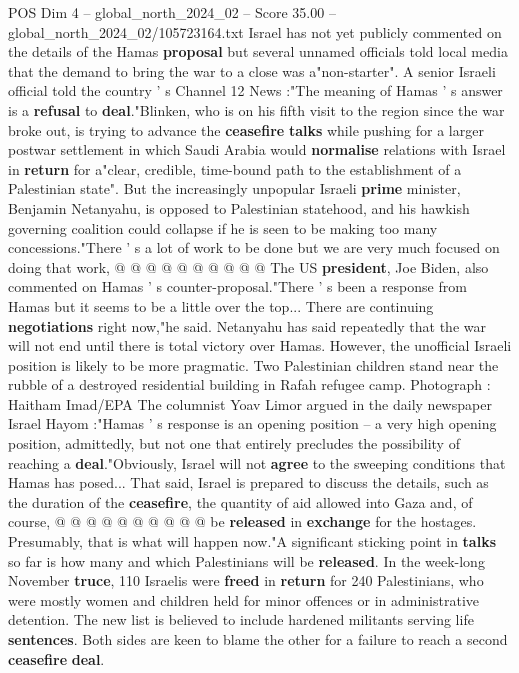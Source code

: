 \begin{textsample}{POS Dim 4 – global\_north\_2024\_02 – Score 35.00 – global\_north\_2024\_02/105723164.txt}
Israel has not yet publicly commented on the details of the Hamas \textbf{proposal} but several unnamed officials told local media that the demand to bring the war to a close was a"non-starter".
A senior Israeli official told the country ' s Channel 12 News :"The meaning of Hamas ' s answer is a \textbf{refusal} to \textbf{deal}."Blinken, who is on his fifth visit to the region since the war broke out, is trying to advance the \textbf{ceasefire} \textbf{talks} while pushing for a larger postwar settlement in which Saudi Arabia would \textbf{normalise} relations with Israel in \textbf{return} for a"clear, credible, time-bound path to the establishment of a Palestinian state".
But the increasingly unpopular Israeli \textbf{prime} minister, Benjamin Netanyahu, is opposed to Palestinian statehood, and his hawkish governing coalition could collapse if he is seen to be making too many concessions."There ' s a lot of work to be done but we are very much focused on doing that work, @ @ @ @ @ @ @ @ @ @ The US \textbf{president}, Joe Biden, also commented on Hamas ' s counter-proposal."There ' s been a response from Hamas but it seems to be a little over the top...
There are continuing \textbf{negotiations} right now,"he said.
Netanyahu has said repeatedly that the war will not end until there is total victory over Hamas.
However, the unofficial Israeli position is likely to be more pragmatic.
Two Palestinian children stand near the rubble of a destroyed residential building in Rafah refugee camp.
Photograph : Haitham Imad/EPA The columnist Yoav Limor argued in the daily newspaper Israel Hayom :"Hamas ' s response is an opening position -- a very high opening position, admittedly, but not one that entirely precludes the possibility of reaching a \textbf{deal}."Obviously, Israel will not \textbf{agree} to the sweeping conditions that Hamas has posed...
That said, Israel is prepared to discuss the details, such as the duration of the \textbf{ceasefire}, the quantity of aid allowed into Gaza and, of course, @ @ @ @ @ @ @ @ @ @ be \textbf{released} in \textbf{exchange} for the hostages.
Presumably, that is what will happen now."A significant sticking point in \textbf{talks} so far is how many and which Palestinians will be \textbf{released}.
In the week-long November \textbf{truce}, 110 Israelis were \textbf{freed} in \textbf{return} for 240 Palestinians, who were mostly women and children held for minor offences or in administrative detention.
The new list is believed to include hardened militants serving life \textbf{sentences}.
Both sides are keen to blame the other for a failure to reach a second \textbf{ceasefire} \textbf{deal}.

\end{textsample}
